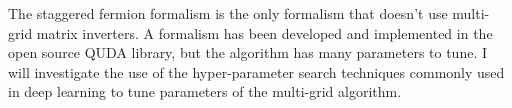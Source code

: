 The staggered fermion formalism is the only formalism that
doesn't use multi-grid matrix inverters. A formalism has been developed
and implemented in the open source QUDA library, but the algorithm has
many parameters to tune. I will investigate the use of the
hyper-parameter search techniques commonly used in deep learning to tune
parameters of the multi-grid algorithm.




